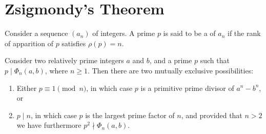 \section{Zsigmondy's Theorem}

\begin{definition}
  Consider a sequence $(a_n)$ of integers. A prime $p$ is said to be a  of $a_n$ if the rank of apparition of $p$ satisfies $\rho(p)=n$.
\end{definition}

\begin{proposition}\label{proposition:zsigmondy}
  Consider two relatively prime integers $a$ and $b$, and a prime $p$ such that $p\mid \Phi_n(a,b)$, where $n\geq 1$. Then there are two mutually exclusive possibilities:
  \begin{enumerate}
  \item Either $p\equiv 1\pmod{n}$, in which case $p$ is a primitive prime divisor of $a^n-b^n$, or
  \item $p\mid n$, in which case $p$ is the largest prime factor of $n$, and provided that $n>2$ we have furthermore $p^2\nmid \Phi_n(a,b)$.
  \end{enumerate}
\end{proposition}

